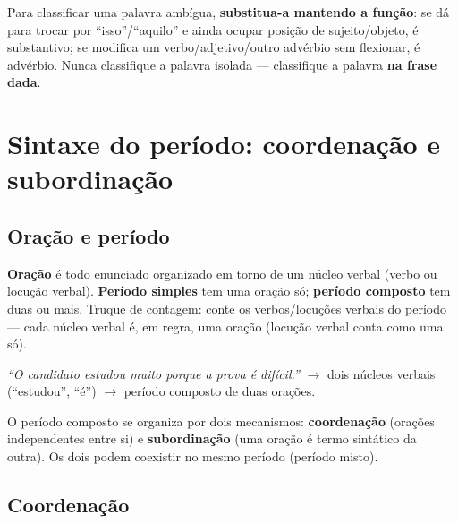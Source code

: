 \begin{regrapratica}
Para classificar uma palavra ambígua, \textbf{substitua-a mantendo a
função}: se dá para trocar por “isso”/“aquilo” e ainda ocupar posição de
sujeito/objeto, é substantivo; se modifica um verbo/adjetivo/outro advérbio
sem flexionar, é advérbio. Nunca classifique a palavra isolada --- classifique
a palavra \textbf{na frase dada}.
\end{regrapratica}

\section{Sintaxe do período: coordenação e subordinação}

\subsection{Oração e período}

\begin{conceito}
\textbf{Oração} é todo enunciado organizado em torno de um núcleo verbal
(verbo ou locução verbal). \textbf{Período simples} tem uma oração só;
\textbf{período composto} tem duas ou mais. Truque de contagem: conte os
verbos/locuções verbais do período --- cada núcleo verbal é, em regra, uma
oração (locução verbal conta como uma só).
\end{conceito}

\begin{exemplo}
\textit{“O candidato estudou muito porque a prova é difícil.”} $\to$ dois
núcleos verbais (“estudou”, “é”) $\to$ período composto de duas orações.
\end{exemplo}

O período composto se organiza por dois mecanismos: \textbf{coordenação}
(orações independentes entre si) e \textbf{subordinação} (uma oração é termo
sintático da outra). Os dois podem coexistir no mesmo período (período
misto).

\subsection{Coordenação}


